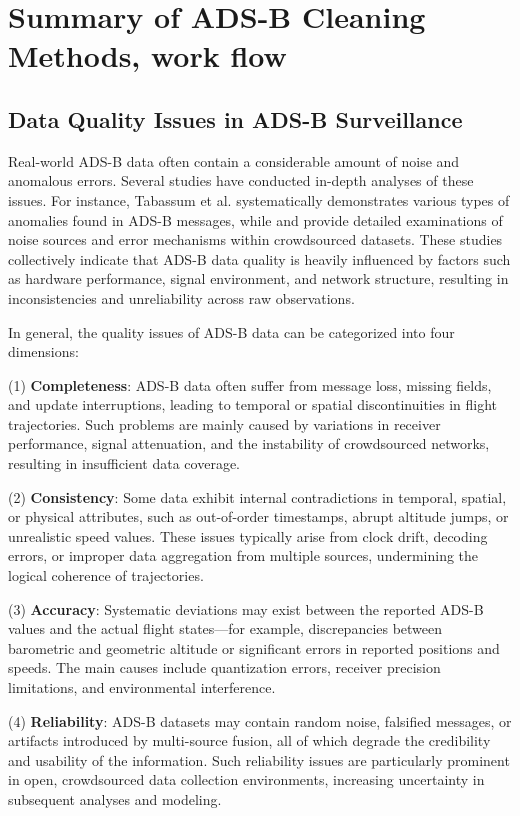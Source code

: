 \section{Summary of ADS-B Cleaning Methods, work flow}

\subsection {Data Quality Issues in ADS-B Surveillance}

Real-world ADS-B data often contain a considerable amount of noise and anomalous errors. Several studies have conducted in-depth analyses of these issues. For instance, Tabassum et al. \cite{8102001} systematically demonstrates various types of anomalies found in ADS-B messages, while \cite{8569833} and \cite{Olive_Krummen_Figuet_Alligier_2025} provide detailed examinations of noise sources and error mechanisms within crowdsourced datasets. These studies collectively indicate that ADS-B data quality is heavily influenced by factors such as hardware performance, signal environment, and network structure, resulting in inconsistencies and unreliability across raw observations.

In general, the quality issues of ADS-B data can be categorized into four dimensions:

(1) \textbf{Completeness}: ADS-B data often suffer from message loss, missing fields, and update interruptions, leading to temporal or spatial discontinuities in flight trajectories. Such problems are mainly caused by variations in receiver performance, signal attenuation, and the instability of crowdsourced networks, resulting in insufficient data coverage.

(2) \textbf{Consistency}: Some data exhibit internal contradictions in temporal, spatial, or physical attributes, such as out-of-order timestamps, abrupt altitude jumps, or unrealistic speed values. These issues typically arise from clock drift, decoding errors, or improper data aggregation from multiple sources, undermining the logical coherence of trajectories.

(3) \textbf{Accuracy}: Systematic deviations may exist between the reported ADS-B values and the actual flight states—for example, discrepancies between barometric and geometric altitude or significant errors in reported positions and speeds. The main causes include quantization errors, receiver precision limitations, and environmental interference.

(4) \textbf{Reliability}: ADS-B datasets may contain random noise, falsified messages, or artifacts introduced by multi-source fusion, all of which degrade the credibility and usability of the information. Such reliability issues are particularly prominent in open, crowdsourced data collection environments, increasing uncertainty in subsequent analyses and modeling.

